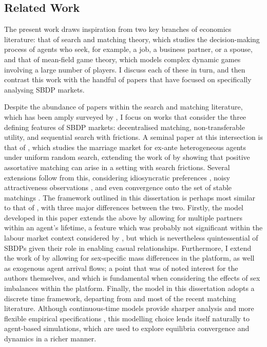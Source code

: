 \subsection{Related Work}
\label{sec:section1.1}
The present work draws inspiration from two key branches of economics literature: that of search and matching theory, which studies the decision-making process of agents who seek, for example, a job, a business partner, or a spouse, and that of mean-field game theory, which models complex dynamic games involving a large number of players. 
I discuss each of these in turn, and then contrast this work with the handful of papers that have focused on specifically analysing SBDP markets.

Despite the abundance of papers within the search and matching literature, which has been amply surveyed by \cite{chade2017sorting}, I focus on works that consider the three defining features of SBDP markets: decentralised matching, non-transferable utility, and sequential search with frictions. 
A seminal paper at this intersection is that of \cite{burdett1997marriage}, which studies the marriage market for ex-ante heterogeneous agents under uniform random search, extending the work of \cite{becker1973theory} by showing that positive assortative matching can arise in a setting with search frictions.
Several extensions follow from this, considering idiosyncratic preferences \citep{burdett1998two}, noisy attractiveness observations \citep{chade2006matching}, and even convergence onto the set of stable matchings \citep{adachi2003search}. 
The framework outlined in this dissertation is perhaps most similar to that of \cite{burdett1998two}, with three major differences between the two. 
Firstly, the model developed in this paper extends the above by allowing for multiple partners within an agent's lifetime, a feature which was probably not significant within the labour market context considered by \cite{burdett1998two}, but which is nevertheless quintessential of SBDPs given their role in enabling casual relationships.
Furthermore, I extend the work of \citeauthor{burdett1998two} by allowing for sex-specific mass differences in the platform, as well as exogenous agent arrival flows; a point that was of noted interest for the authors themselves, and which is fundamental when considering the effects of sex imbalances within the platform. 
Finally, the model in this dissertation adopts a discrete time framework, departing from \cite{burdett1998two} and most of the recent matching literature. 
Although continuous-time models provide sharper analysis and more flexible empirical specifications \citep{burdett1999long}, this modelling choice lends itself naturally to agent-based simulations, which are used to explore equilibria convergence and dynamics in a richer manner.

